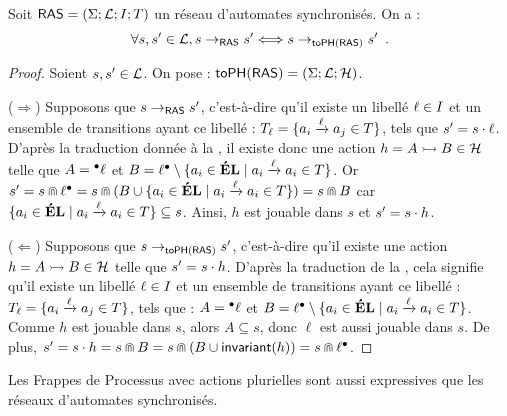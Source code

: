\begin{theorem}[$\AN \approx \antophm$]
  Soit $\mathsf{RAS} = (\Sigma; \mathcal{L}; I; T)$ un réseau d'automates synchronisés.
  On a :
  \[\forall s, s' \in \mathcal{L}, s \rightarrow_{\mathsf{RAS}} s' \Longleftrightarrow s \rightarrow_{\mathsf{toPH}(\mathsf{RAS})} s' \enspace.\]
\end{theorem}

\begin{proof}
  Soient $s, s' \in \mathcal{L}$.
  On pose : $\mathsf{toPH}(\mathsf{RAS}) = (\Sigma; \mathcal{L}; \mathcal{H})$.
  
  ($\Rightarrow$) Supposons que $s \rightarrow_{\mathsf{RAS}} s'$,
    c'est-à-dire qu'il existe un libellé $\ell \in I$ et un ensemble de transitions
    ayant ce libellé : $T_\ell = \{ a_i \xrightarrow{\ell} a_j \in T \}$,
    tels que $s' = s \cdot \ell$.
    D'après la traduction donnée à la , il existe donc une action
    $h = \mbox{$A \rightarrowtail B$} \in \mathcal{H}$ telle que $A = {}^\bullet \ell$ et
    $B = \ell {}^\bullet \setminus \{ a_i \in \mathbf{\acute{E}L} \mid a_i \xrightarrow{\ell} a_i \in T \}$.
    Or $s' = s \Cap \ell {}^\bullet
      = s \Cap (B \cup \{ a_i \in \mathbf{\acute{E}L} \mid a_i \xrightarrow{\ell} a_i \in T \})
      = s \Cap B$
    car $\{ a_i \in \mathbf{\acute{E}L} \mid a_i \xrightarrow{\ell} a_i \in T \} \subseteq s$.
    Ainsi, $h$ est jouable dans $s$ et $s' = s \cdot h$.
  
  ($\Leftarrow$) Supposons que $s \rightarrow_{\mathsf{toPH}(\mathsf{RAS})} s'$,
    c'est-à-dire qu'il existe une action $h = \mbox{$A \rightarrowtail B$} \in \mathcal{H}$
    telle que $s' = s \cdot h$.
    D'après la traduction de la ,
    cela signifie qu'il existe un libellé $\ell \in I$ et un ensemble de transitions
    ayant ce libellé : $T_\ell = \{ a_i \xrightarrow{\ell} a_j \in T \}$,
    tels que : $A = {}^\bullet \ell$ et
    $B = \ell {}^\bullet \setminus \{ a_i \in \mathbf{\acute{E}L} \mid a_i \xrightarrow{\ell} a_i \in T \}$.
    Comme $h$ est jouable dans $s$, alors $A \subseteq s$, donc $\ell$ est aussi jouable dans $s$.
    De plus, $s' = s \cdot h = s \Cap B = s \Cap (B \cup \mathsf{invariant}(h))
      = s \Cap \ell {}^\bullet$.
\end{proof}

\begin{theorem}
  Les Frappes de Processus avec actions plurielles sont aussi expressives
  que les réseaux d'automates synchronisés.
\end{theorem}

